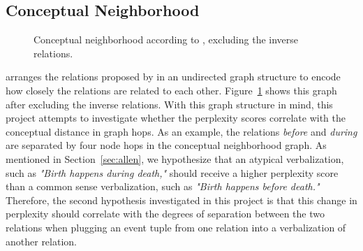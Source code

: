 \documentclass[11pt]{article}
\begin{document}
\subsection{Conceptual Neighborhood}

\begin{figure}
  \begin{center}
  \end{center}
  \caption{Conceptual neighborhood according to \citet{freksa}, excluding the inverse relations.}
  \label{fig:conceptual_neighborhood}
\end{figure}


\citet{freksa} arranges the relations proposed by \citet{allen} in an undirected graph structure to encode how closely the relations are related to each other. Figure~\ref{fig:conceptual_neighborhood} shows this graph after excluding the inverse relations. With this graph structure in mind, this project attempts to investigate whether the perplexity scores correlate with the conceptual distance in graph hops. As an example, the relations \textit{before} and \textit{during} are separated by four node hops in the conceptual neighborhood graph. As mentioned in Section~\ref{sec:allen}, we hypothesize that an atypical verbalization, such as \textit{"Birth happens during death,"} should receive a higher perplexity score than a common sense verbalization, such as \textit{"Birth happens before death."} Therefore, the second hypothesis investigated in this project is that this change in perplexity should correlate with the degrees of separation between the two relations when plugging an event tuple from one relation into a verbalization of another relation.
\end{document}
